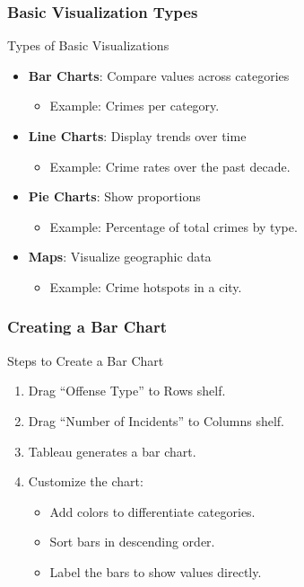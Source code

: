 \documentclass[aspectratio=169]{beamer}
\begin{document}
\begin{frame}[fragile]
    \frametitle{Basic Visualization Types}
    \begin{block}{Types of Basic Visualizations}
        \begin{itemize}
            \item \textbf{Bar Charts}: Compare values across categories 
                \begin{itemize}
                    \item Example: Crimes per category.
                \end{itemize}
            \item \textbf{Line Charts}: Display trends over time 
                \begin{itemize}
                    \item Example: Crime rates over the past decade.
                \end{itemize}
            \item \textbf{Pie Charts}: Show proportions 
                \begin{itemize}
                    \item Example: Percentage of total crimes by type.
                \end{itemize}
            \item \textbf{Maps}: Visualize geographic data 
                \begin{itemize}
                    \item Example: Crime hotspots in a city.
                \end{itemize}
        \end{itemize}
    \end{block}
\end{frame}

\begin{frame}[fragile]
    \frametitle{Creating a Bar Chart}
    \begin{block}{Steps to Create a Bar Chart}
        \begin{enumerate}
            \item Drag “Offense Type” to Rows shelf.
            \item Drag “Number of Incidents” to Columns shelf.
            \item Tableau generates a bar chart.
            \item Customize the chart:
                \begin{itemize}
                    \item Add colors to differentiate categories.
                    \item Sort bars in descending order.
                    \item Label the bars to show values directly.
                \end{itemize}
        \end{enumerate}
    \end{block}
\end{frame}
\end{document}
